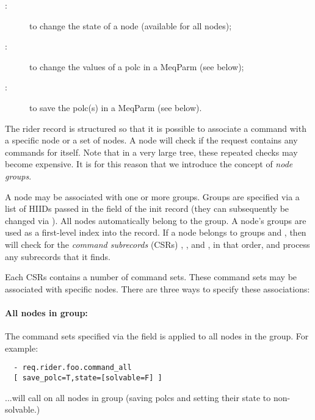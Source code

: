   \begin{description}
  
  \item[:] to change the state of a node (available for all nodes);
  
  \item[:] to change the values of a polc in a MeqParm (see
  below);
  
  \item[:] to save the polc(s) in a MeqParm (see below).
  
  \end{description}
  
  The rider record is structured so that it is possible to associate a command
  with a specific node or a set of nodes. A node will check if the request
  contains any commands for itself. Note that in a very large tree, these
  repeated checks may become expensive. It is for this reason that we introduce
  the concept of {\em node groups}. 
  
  A node may be associated with one or more groups. Groups are specified via a
  list of HIIDs passed in the  field of the init record (they
  can subsequently be changed via ). All nodes automatically
  belong to the  group. A node's groups are used as a first-level index
  into the  record. If a node belongs to groups  and
  , then  will check for the {\em command
  subrecords}\/ (CSRs) , , and , in
  that order, and process any subrecords that it finds.

  Each CSRs contains a number of command sets. These command sets may be
  associated with specific nodes. There are three ways to specify these
  associations:
  
  \paragraph{All nodes in group:} The command sets specified via the field
   is applied to all nodes in the group. For example:

\begin{verbatim}
  - req.rider.foo.command_all
  [ save_polc=T,state=[solvable=F] ]  
\end{verbatim}

  ...will call  on all nodes in group  (saving
  polcs and setting their state to non-solvable.)

